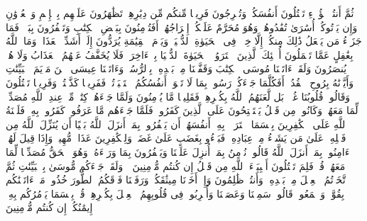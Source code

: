 \stopbuffer
\startbuffer[\q:2:85]
ثُمَّ أَنتُمۡ هَٰۤؤُلَاۤءِ تَقۡتُلُونَ أَنفُسَكُمۡ وَتُخۡرِجُونَ فَرِیقࣰا مِّنكُم مِّن دِیَٰرِهِمۡ تَظَٰهَرُونَ عَلَیۡهِم بِٱلۡإِثۡمِ وَٱلۡعُدۡوَٰنِ وَإِن یَأۡتُوكُمۡ أُسَٰرَىٰ تُفَٰدُوهُمۡ وَهُوَ مُحَرَّمٌ عَلَیۡكُمۡ إِخۡرَاجُهُمۡۚ أَفَتُؤۡمِنُونَ بِبَعۡضِ ٱلۡكِتَٰبِ وَتَكۡفُرُونَ بِبَعۡضࣲۚ فَمَا جَزَاۤءُ مَن یَفۡعَلُ ذَٰلِكَ مِنكُمۡ إِلَّا خِزۡیࣱ فِی ٱلۡحَیَوٰةِ ٱلدُّنۡیَاۖ وَیَوۡمَ ٱلۡقِیَٰمَةِ یُرَدُّونَ إِلَىٰۤ أَشَدِّ ٱلۡعَذَابِۗ وَمَا ٱللَّهُ بِغَٰفِلٍ عَمَّا تَعۡمَلُونَ%
\stopbuffer
\startbuffer[\q:2:86]
أُو۟لَٰۤئِكَ ٱلَّذِینَ ٱشۡتَرَوُا۟ ٱلۡحَیَوٰةَ ٱلدُّنۡیَا بِٱلۡءَاخِرَةِۖ فَلَا یُخَفَّفُ عَنۡهُمُ ٱلۡعَذَابُ وَلَا هُمۡ یُنصَرُونَ%
\stopbuffer
\startbuffer[\q:2:87]
وَلَقَدۡ ءَاتَیۡنَا مُوسَى ٱلۡكِتَٰبَ وَقَفَّیۡنَا مِنۢ بَعۡدِهِۦ بِٱلرُّسُلِۖ وَءَاتَیۡنَا عِیسَى ٱبۡنَ مَرۡیَمَ ٱلۡبَیِّنَٰتِ وَأَیَّدۡنَٰهُ بِرُوحِ ٱلۡقُدُسِۗ أَفَكُلَّمَا جَاۤءَكُمۡ رَسُولُۢ بِمَا لَا تَهۡوَىٰۤ أَنفُسُكُمُ ٱسۡتَكۡبَرۡتُمۡ فَفَرِیقࣰا كَذَّبۡتُمۡ وَفَرِیقࣰا تَقۡتُلُونَ%
\stopbuffer
\startbuffer[\q:2:88]
وَقَالُوا۟ قُلُوبُنَا غُلۡفُۢۚ بَل لَّعَنَهُمُ ٱللَّهُ بِكُفۡرِهِمۡ فَقَلِیلࣰا مَّا یُؤۡمِنُونَ%
\stopbuffer
\startbuffer[\q:2:89]
وَلَمَّا جَاۤءَهُمۡ كِتَٰبࣱ مِّنۡ عِندِ ٱللَّهِ مُصَدِّقࣱ لِّمَا مَعَهُمۡ وَكَانُوا۟ مِن قَبۡلُ یَسۡتَفۡتِحُونَ عَلَى ٱلَّذِینَ كَفَرُوا۟ فَلَمَّا جَاۤءَهُم مَّا عَرَفُوا۟ كَفَرُوا۟ بِهِۦۚ فَلَعۡنَةُ ٱللَّهِ عَلَى ٱلۡكَٰفِرِینَ%
\stopbuffer
\startbuffer[\q:2:90]
بِئۡسَمَا ٱشۡتَرَوۡا۟ بِهِۦۤ أَنفُسَهُمۡ أَن یَكۡفُرُوا۟ بِمَاۤ أَنزَلَ ٱللَّهُ بَغۡیًا أَن یُنَزِّلَ ٱللَّهُ مِن فَضۡلِهِۦ عَلَىٰ مَن یَشَاۤءُ مِنۡ عِبَادِهِۦۖ فَبَاۤءُو بِغَضَبٍ عَلَىٰ غَضَبࣲۚ وَلِلۡكَٰفِرِینَ عَذَابࣱ مُّهِینࣱ%
\stopbuffer
\startbuffer[\q:2:91]
وَإِذَا قِیلَ لَهُمۡ ءَامِنُوا۟ بِمَاۤ أَنزَلَ ٱللَّهُ قَالُوا۟ نُؤۡمِنُ بِمَاۤ أُنزِلَ عَلَیۡنَا وَیَكۡفُرُونَ بِمَا وَرَاۤءَهُۥ وَهُوَ ٱلۡحَقُّ مُصَدِّقࣰا لِّمَا مَعَهُمۡۗ قُلۡ فَلِمَ تَقۡتُلُونَ أَنۢبِیَاۤءَ ٱللَّهِ مِن قَبۡلُ إِن كُنتُم مُّؤۡمِنِینَ%
\stopbuffer
\startbuffer[\q:2:92]
۞ وَلَقَدۡ جَاۤءَكُم مُّوسَىٰ بِٱلۡبَیِّنَٰتِ ثُمَّ ٱتَّخَذۡتُمُ ٱلۡعِجۡلَ مِنۢ بَعۡدِهِۦ وَأَنتُمۡ ظَٰلِمُونَ%
\stopbuffer
\startbuffer[\q:2:93]
وَإِذۡ أَخَذۡنَا مِیثَٰقَكُمۡ وَرَفَعۡنَا فَوۡقَكُمُ ٱلطُّورَ خُذُوا۟ مَاۤ ءَاتَیۡنَٰكُم بِقُوَّةࣲ وَٱسۡمَعُوا۟ۖ قَالُوا۟ سَمِعۡنَا وَعَصَیۡنَا وَأُشۡرِبُوا۟ فِی قُلُوبِهِمُ ٱلۡعِجۡلَ بِكُفۡرِهِمۡۚ قُلۡ بِئۡسَمَا یَأۡمُرُكُم بِهِۦۤ إِیمَٰنُكُمۡ إِن كُنتُم مُّؤۡمِنِینَ%
\stopbuffer
